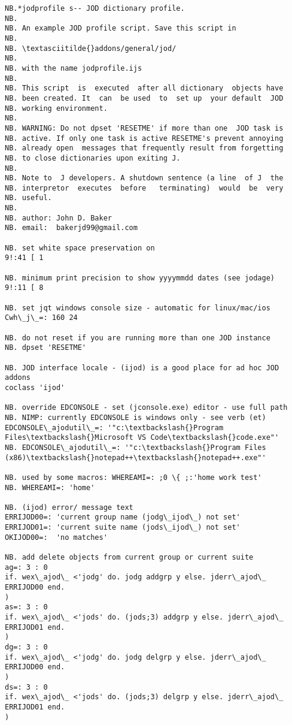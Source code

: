 \documentclass[11pt,letter,landscape]{article}
\begin{document}
    \begin{Verbatim}[commandchars=\\\{\}]
NB.*jodprofile s-- JOD dictionary profile.
NB.
NB. An example JOD profile script. Save this script in
NB.
NB. \textasciitilde{}addons/general/jod/
NB.
NB. with the name jodprofile.ijs
NB.
NB. This script  is  executed  after all dictionary  objects have
NB. been created. It  can  be used  to  set up  your default  JOD
NB. working environment.
NB.
NB. WARNING: Do not dpset 'RESETME' if more than one  JOD task is
NB. active. If only one task is active RESETME's prevent annoying
NB. already open  messages that frequently result from forgetting
NB. to close dictionaries upon exiting J.
NB.
NB. Note to  J developers. A shutdown sentence (a line  of J  the
NB. interpretor  executes  before   terminating)  would  be  very
NB. useful.
NB.
NB. author: John D. Baker
NB. email:  bakerjd99@gmail.com

NB. set white space preservation on
9!:41 [ 1

NB. minimum print precision to show yyyymmdd dates (see jodage)
9!:11 [ 8

NB. set jqt windows console size - automatic for linux/mac/ios
Cwh\_j\_=: 160 24

NB. do not reset if you are running more than one JOD instance
NB. dpset 'RESETME'

NB. JOD interface locale - (ijod) is a good place for ad hoc JOD addons
coclass 'ijod'

NB. override EDCONSOLE - set (jconsole.exe) editor - use full path
NB. NIMP: currently EDCONSOLE is windows only - see verb (et) 
EDCONSOLE\_ajodutil\_=: '"c:\textbackslash{}Program Files\textbackslash{}Microsoft VS Code\textbackslash{}code.exe"'
NB. EDCONSOLE\_ajodutil\_=: '"c:\textbackslash{}Program Files (x86)\textbackslash{}notepad++\textbackslash{}notepad++.exe"'

NB. used by some macros: WHEREAMI=: ;0 \{ ;:'home work test'
NB. WHEREAMI=: 'home'

NB. (ijod) error/ message text
ERRIJOD00=: 'current group name (jodg\_ijod\_) not set'
ERRIJOD01=: 'current suite name (jods\_ijod\_) not set'
OKIJOD00=:  'no matches'

NB. add delete objects from current group or current suite
ag=: 3 : 0
if. wex\_ajod\_ <'jodg' do. jodg addgrp y else. jderr\_ajod\_ ERRIJOD00 end.
)
as=: 3 : 0
if. wex\_ajod\_ <'jods' do. (jods;3) addgrp y else. jderr\_ajod\_ ERRIJOD01 end.
)
dg=: 3 : 0
if. wex\_ajod\_ <'jodg' do. jodg delgrp y else. jderr\_ajod\_ ERRIJOD00 end.
)
ds=: 3 : 0
if. wex\_ajod\_ <'jods' do. (jods;3) delgrp y else. jderr\_ajod\_ ERRIJOD01 end. 
)
   

\end{Verbatim}
\end{document}

